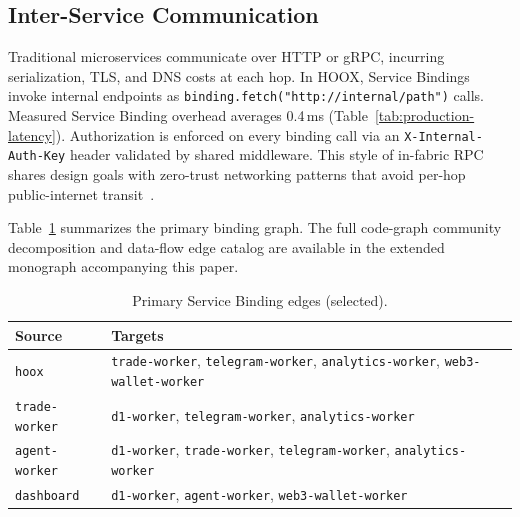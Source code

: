 \subsection{Inter-Service Communication}

Traditional microservices communicate over HTTP or gRPC, incurring serialization, TLS, and DNS costs at each hop. In \textsc{HOOX}, Service Bindings invoke internal endpoints as \texttt{binding.fetch("http://internal/path")} calls. Measured Service Binding overhead averages 0.4\,ms (Table~\ref{tab:production-latency}). Authorization is enforced on every binding call via an \texttt{X-Internal-Auth-Key} header validated by shared middleware. This style of in-fabric RPC shares design goals with zero-trust networking patterns that avoid per-hop public-internet transit~\cite{nist2020zerotrust,decandia2007dynamo}.

Table~\ref{tab:bindings} summarizes the primary binding graph. The full code-graph community decomposition and data-flow edge catalog are available in the extended monograph accompanying this paper.

\begin{table}[t]
  \centering
  \caption{Primary Service Binding edges (selected).}
  \label{tab:bindings}
  \small
  \begin{tabular*}{\linewidth}{@{\extracolsep{\fill}}ll@{}}
    \toprule
    \textbf{Source} & \textbf{Targets} \\
    \midrule
    \texttt{hoox} & \texttt{trade-worker}, \texttt{telegram-worker}, \texttt{analytics-worker}, \texttt{web3-wallet-worker} \\
    \texttt{trade-worker} & \texttt{d1-worker}, \texttt{telegram-worker}, \texttt{analytics-worker} \\
    \texttt{agent-worker} & \texttt{d1-worker}, \texttt{trade-worker}, \texttt{telegram-worker}, \texttt{analytics-worker} \\
    \texttt{dashboard} & \texttt{d1-worker}, \texttt{agent-worker}, \texttt{web3-wallet-worker} \\
    \bottomrule
  \end{tabular*}
\end{table}
